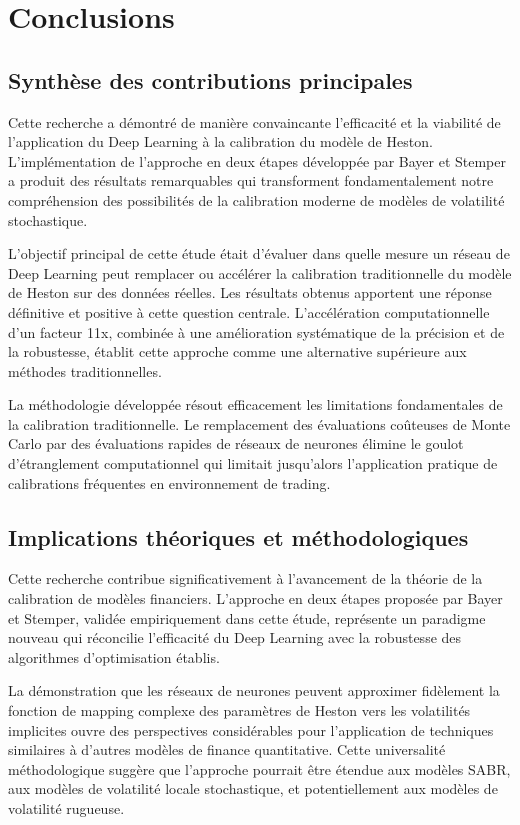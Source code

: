 \chapter{Conclusions}

\section{Synthèse des contributions principales}

Cette recherche a démontré de manière convaincante l'efficacité et la viabilité de l'application du Deep Learning à la calibration du modèle de Heston. L'implémentation de l'approche en deux étapes développée par Bayer et Stemper a produit des résultats remarquables qui transforment fondamentalement notre compréhension des possibilités de la calibration moderne de modèles de volatilité stochastique.

L'objectif principal de cette étude était d'évaluer dans quelle mesure un réseau de Deep Learning peut remplacer ou accélérer la calibration traditionnelle du modèle de Heston sur des données réelles. Les résultats obtenus apportent une réponse définitive et positive à cette question centrale. L'accélération computationnelle d'un facteur 11x, combinée à une amélioration systématique de la précision et de la robustesse, établit cette approche comme une alternative supérieure aux méthodes traditionnelles.

La méthodologie développée résout efficacement les limitations fondamentales de la calibration traditionnelle. Le remplacement des évaluations coûteuses de Monte Carlo par des évaluations rapides de réseaux de neurones élimine le goulot d'étranglement computationnel qui limitait jusqu'alors l'application pratique de calibrations fréquentes en environnement de trading.

\section{Implications théoriques et méthodologiques}

Cette recherche contribue significativement à l'avancement de la théorie de la calibration de modèles financiers. L'approche en deux étapes proposée par Bayer et Stemper, validée empiriquement dans cette étude, représente un paradigme nouveau qui réconcilie l'efficacité du Deep Learning avec la robustesse des algorithmes d'optimisation établis.

La démonstration que les réseaux de neurones peuvent approximer fidèlement la fonction de mapping complexe des paramètres de Heston vers les volatilités implicites ouvre des perspectives considérables pour l'application de techniques similaires à d'autres modèles de finance quantitative. Cette universalité méthodologique suggère que l'approche pourrait être étendue aux modèles SABR, aux modèles de volatilité locale stochastique, et potentiellement aux modèles de volatilité rugueuse.

